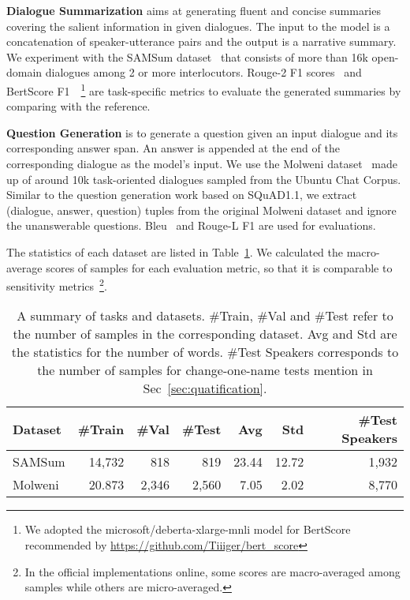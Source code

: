 
\textbf{Dialogue Summarization} aims at generating fluent and concise summaries covering the salient information in given dialogues. The input to the model is a concatenation of speaker-utterance pairs and the output is a narrative summary. We experiment with the SAMSum dataset~\cite{gliwa2019samsum} that consists of more than 16k open-domain dialogues among 2 or more interlocutors. Rouge-2 F1 scores~\cite{lin2004rouge} and BertScore F1~\cite{zhang2019bertscore}~\footnote{We adopted the microsoft/deberta-xlarge-mnli model for BertScore recommended by \url{https://github.com/Tiiiger/bert_score}} are task-specific metrics to evaluate the generated summaries by comparing with the reference.

\textbf{Question Generation} is to generate a question given an input dialogue and its corresponding answer span. An answer is appended at the end of the corresponding dialogue as the model's input. We use the Molweni dataset~\cite{li2020molweni} made up of around 10k task-oriented dialogues sampled from the Ubuntu Chat Corpus.
Similar to the question generation work based on SQuAD1.1, we extract (dialogue, answer, question) tuples from the original Molweni dataset and ignore the unanswerable questions. Bleu~\cite{papineni2002bleu} and Rouge-L F1 are used for evaluations.



The statistics of each dataset are listed in Table~\ref{tab:taskdata}. We calculated the macro-average scores of samples for each evaluation metric, so that it is comparable to sensitivity metrics~\footnote{In the official implementations online, some scores are macro-averaged among samples while others are micro-averaged.}.

\begin{table}[h]
	\scriptsize
	\centering
	\begin{tabular}{lrrrrrr}
		\hline
		\textbf{Dataset} & \textbf{\#Train} &\textbf{ \#Val} & \textbf{\#Test}  & \textbf{Avg} & \textbf{Std} &\textbf{\#Test Speakers} \\
		\hline
		
		SAMSum & 14,732 & 818 & 819 & 23.44 & 12.72 & 1,932\\
		Molweni &20.873 & 2,346 & 2,560 & 7.05& 2.02 & 8,770\\
		
		
		\hline
	\end{tabular}
	\caption{A summary of tasks and datasets. \#Train, \#Val and \#Test refer to the number of samples in the corresponding dataset. Avg and Std are the statistics for the number of words. \#Test Speakers corresponds to the number of samples for change-one-name tests mention in Sec~\ref{sec:quatification}.}
	\label{tab:taskdata}
\end{table}



